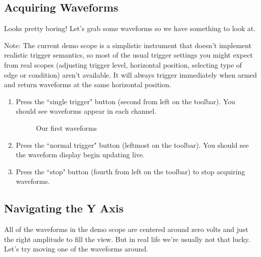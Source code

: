 \FloatBarrier

\subsection{Acquiring Waveforms}

Looks pretty boring! Let's grab some waveforms so we have something to look at.

Note: The current demo scope is a simplistic instrument that doesn't implement realistic trigger semantics, so most of
the usual trigger settings you might expect from real scopes (adjusting trigger level, horizontal position, selecting
type of edge or condition) aren't available. It will always trigger immediately when armed and return waveforms at the
same horizontal position.

\begin{enumerate}
\item Press the ``single trigger" button (second from left on the toolbar). You should see waveforms appear in each
channel.

\begin{figure}[h]
\centering
{}
\caption{Our first waveforms}
\label{basic-first}
\end{figure}

\item Press the ``normal trigger" button (leftmost on the toolbar). You should see the waveform display begin updating
live.

\item Press the ``stop" button (fourth from left on the toolbar) to stop acquiring waveforms.

\end{enumerate}

\subsection{Navigating the Y Axis}

All of the waveforms in the demo scope are centered around zero volts and just the right amplitude to fill the view.
But in real life we're usually not that lucky. Let's try moving one of the waveforms around.

